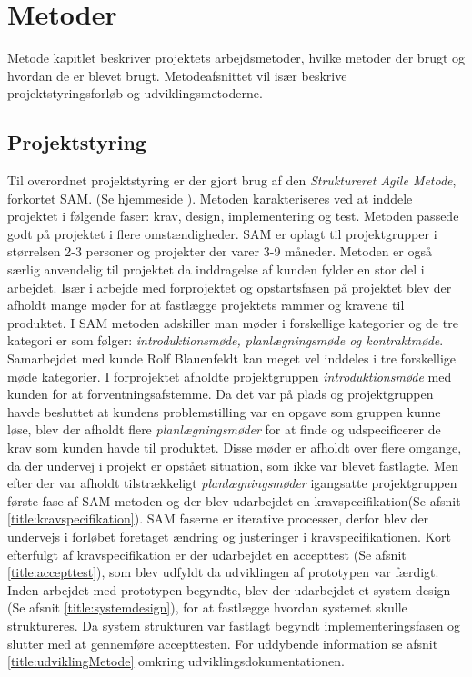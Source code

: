 \chapter{Metoder}
Metode kapitlet beskriver projektets arbejdsmetoder, hvilke metoder der brugt og hvordan de er blevet brugt. Metodeafsnittet vil især beskrive projektstyringsforløb og udviklingsmetoderne. 

\section{Projektstyring} \label{title:projektstyring}
Til overordnet projektstyring er der gjort brug af den \textit{Struktureret Agile Metode}, forkortet SAM. (Se hjemmeside ). Metoden karakteriseres ved at inddele projektet i følgende faser: krav, design, implementering og test. Metoden passede godt på projektet i flere omstændigheder. SAM er oplagt til projektgrupper i størrelsen 2-3 personer og projekter der varer 3-9 måneder. Metoden er også særlig anvendelig til projektet da inddragelse af kunden fylder en stor del i arbejdet. 
Især i arbejde med forprojektet og opstartsfasen på projektet blev der afholdt mange møder for at fastlægge projektets rammer og kravene til produktet. I SAM metoden adskiller man møder i forskellige kategorier og de tre kategori er som følger: \textit{introduktionsmøde, planlægningsmøde og kontraktmøde}. Samarbejdet med kunde Rolf Blauenfeldt kan meget vel inddeles i tre forskellige møde kategorier. I forprojektet afholdte projektgruppen \textit{introduktionsmøde} med kunden for at forventningsafstemme. Da det var på plads og projektgruppen havde besluttet at kundens problemstilling var en opgave som gruppen kunne løse, blev der afholdt flere \textit{planlægningsmøder} for at finde og udspecificerer de  krav som kunden havde til produktet. Disse møder er afholdt over flere omgange, da der undervej i projekt er opstået situation, som ikke var blevet fastlagte. Men efter der var afholdt tilstrækkeligt \textit{planlægningsmøder} igangsatte projektgruppen første fase af SAM metoden og der blev udarbejdet en kravspecifikation(Se afsnit \ref{title:kravspecifikation}). SAM faserne er iterative processer, derfor blev der undervejs i forløbet  foretaget ændring og justeringer i kravspecifikationen. Kort efterfulgt af kravspecifikation er der udarbejdet en accepttest (Se afsnit \ref{title:accepttest}), som blev udfyldt da udviklingen af prototypen var færdigt. Inden arbejdet med prototypen begyndte, blev der udarbejdet et system design (Se afsnit \ref{title:systemdesign}), for at fastlægge hvordan systemet skulle struktureres. Da system strukturen var fastlagt begyndt implementeringsfasen og slutter med at gennemføre accepttesten. For uddybende information se afsnit \ref{title:udviklingMetode} omkring udviklingsdokumentationen.

